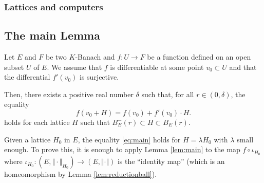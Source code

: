 \documentclass{amsart}
\begin{document}
\subsubsection*{Lattices and computers}


\subsection{The main Lemma}

\begin{lem} \label{lem:main}
Let $E$ and $F$ be two $K$-Banach and $f : U 
\rightarrow F$ be a function defined on an open subset $U$ of $E$.
We assume that $f$ is differentiable at some point $v_0 \subset 
U$ and that the differential $f'(v_0)$ is surjective. 

Then, there exists a positive real number $\delta$ such that, for all $r 
\in (0, \delta)$, the equality
\begin{equation}
\label{eq:main}
f(v_0 + H) = f(v_0) + f'(v_0) \cdot H.
\end{equation}
holds for each lattice $H$ such that $B^-_E(r) \subset H \subset
B_E(r)$.
\end{lem}

\begin{rmk}
Given a lattice $H_0$ in $E$, the equality \eqref{eq:main} holds for $H 
= \lambda H_0$ with $\lambda$ small enough. To prove this, it is enough 
to apply Lemma \ref{lem:main} to the map $f \circ \iota_{H_0}$ where 
$\iota_{H_0} : (E, \Vert \cdot \Vert_{H_0}) \to (E, \Vert \cdot \Vert)$ 
is the ``identity map'' (which is an homeomorphism by Lemma 
\ref{lem:reductionball}).
\end{rmk}
\end{document}
